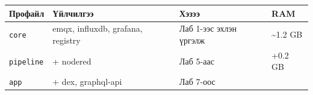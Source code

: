 \begingroup\scriptsize\begin{longtable}[]{@{}llll@{}}
\toprule
\begin{minipage}[b]{0.22\columnwidth}\raggedright
Профайл\strut
\end{minipage} & \begin{minipage}[b]{0.22\columnwidth}\raggedright
Үйлчилгээ\strut
\end{minipage} & \begin{minipage}[b]{0.22\columnwidth}\raggedright
Хэзээ\strut
\end{minipage} & \begin{minipage}[b]{0.22\columnwidth}\raggedright
RAM\strut
\end{minipage}\tabularnewline
\midrule
\endhead
\begin{minipage}[t]{0.22\columnwidth}\raggedright
\texttt{core}\strut
\end{minipage} & \begin{minipage}[t]{0.22\columnwidth}\raggedright
emqx, influxdb, grafana, registry\strut
\end{minipage} & \begin{minipage}[t]{0.22\columnwidth}\raggedright
Лаб 1-ээс эхлэн үргэлж\strut
\end{minipage} & \begin{minipage}[t]{0.22\columnwidth}\raggedright
\textasciitilde1.2 GB\strut
\end{minipage}\tabularnewline
\begin{minipage}[t]{0.22\columnwidth}\raggedright
\texttt{pipeline}\strut
\end{minipage} & \begin{minipage}[t]{0.22\columnwidth}\raggedright
+ nodered\strut
\end{minipage} & \begin{minipage}[t]{0.22\columnwidth}\raggedright
Лаб 5-аас\strut
\end{minipage} & \begin{minipage}[t]{0.22\columnwidth}\raggedright
+0.2 GB\strut
\end{minipage}\tabularnewline
\begin{minipage}[t]{0.22\columnwidth}\raggedright
\texttt{app}\strut
\end{minipage} & \begin{minipage}[t]{0.22\columnwidth}\raggedright
+ dex, graphql-api\strut
\end{minipage} & \begin{minipage}[t]{0.22\columnwidth}\raggedright
Лаб 7-оос\strut

\end{minipage}
\end{longtable}
